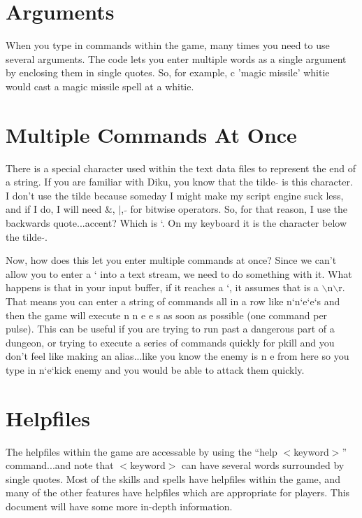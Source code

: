 \section{Arguments}

When you type in commands within the game, many times you need to use
several arguments. The code lets you enter multiple words as a single
argument by enclosing them in single quotes. So, for example, c 'magic
missile' whitie would cast a magic missile spell at a whitie.

\section{Multiple Commands At Once}

There is a special character used within the text data files to
represent the end of a string. If you are familiar with Diku, you know
that the tilde $\tilde{}$ is this character. I don't use the tilde
because someday I might make my script engine suck less, and if I do,
I will need \&, $\vert$, $\tilde{}$ for bitwise operators. So, for
that reason, I use the backwards quote...accent? Which is `. On my
keyboard it is the character below the tilde $\tilde{}$.

Now, how does this let you enter multiple commands at once? Since we
can't allow you to enter a ` into a text stream, we need to do
something with it. What happens is that in your input buffer, if it
reaches a `, it assumes that is a $\backslash$n$\backslash$r. That
means you can enter a string of commands all in a row like n`n`e`e`s
and then the game will execute n n e e s as soon as possible (one
command per pulse). This can be useful if you are trying to run past a
dangerous part of a dungeon, or trying to execute a series of commands
quickly for pkill and you don't feel like making an alias...like you
know the enemy is n e from here so you type in n`e`kick enemy and you
would be able to attack them quickly.

\section{Helpfiles}

The helpfiles within the game are accessable by using the ``help
$<$keyword$>$'' command...and note that $<$keyword$>$ can have several
words surrounded by single quotes. Most of the skills and spells have
helpfiles within the game, and many of the other features have
helpfiles which are appropriate for players. This document will have
some more in-depth information.

